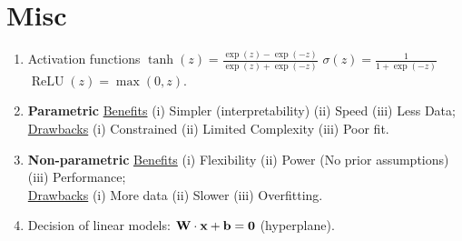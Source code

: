 \documentclass[4pt]{article}
\begin{document}
	\section{Misc}
	\begin{enumerate}
		\item Activation functions $\tanh (z)=\frac{\exp (z)-\exp (-z)}{\exp (z)+\exp (-z)}$ \quad $\sigma(z)=\frac{1}{1+\exp (-z)}$ \quad $\operatorname{ReLU}(z)=\max (0, z)$.
		\item \textbf{Parametric} \ul{Benefits} (i) Simpler (interpretability) (ii) Speed (iii) Less Data; 
		\\ \ul{Drawbacks} (i) Constrained (ii) Limited Complexity (iii) Poor fit.
		\item \textbf{Non-parametric} \ul{Benefits} (i) Flexibility (ii) Power (No prior assumptions) (iii) Performance;
		\\ \ul{Drawbacks} (i) More data (ii) Slower (iii) Overfitting.
		\item Decision of linear models: $\textbf{W} \cdot \textbf{x} + \textbf{b} = \textbf{0}$ (hyperplane).
	\end{enumerate}
\end{document}
